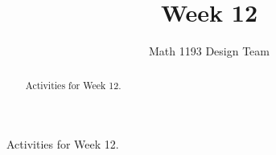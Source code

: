 \documentclass[noauthor]{ximera}
\title{Week 12}
\author{Math 1193 Design Team}
\begin{document}
\begin{abstract}
    Activities for Week 12.
\end{abstract}
\maketitle

Activities for Week 12.
\end{document}

